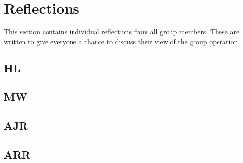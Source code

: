 \section{Reflections}

This section contains individual reflections from all group members. 
These are written to give everyone a chance to discuss their view of the group operation. 


\subsection{HL}

\subsection{MW}

\subsection{AJR}

\subsection{ARR}

